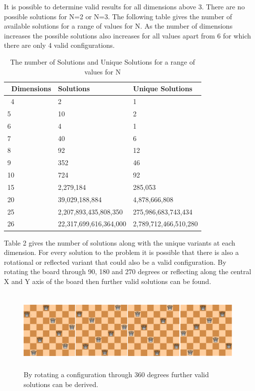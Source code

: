 \documentclass[a4paper,onecolumn,11pt]{article}
\begin{document}
It is possible to determine valid results for all dimensions above 3. There are no possible solutions for N=2 or N=3. The following table gives the number of available solutions for a range of values for N. As the number of dimensions increases the possible solutions also increases for all values apart from 6 for which there are only 4 valid configurations. 

\begin{table}[ht]
\begin{tabular}{|p{2cm}|p{6cm}|p{6cm}|} 
		\hline\
		Dimensions & Solutions & Unique Solutions \\
		\hline\
		4 & 2 & 1 \\ 
		5 & 10 & 2 \\
		6 & 4 & 1 \\
		7 & 40 & 6 \\
		8 & 92 & 12 \\
		9 & 352 & 46 \\
		10 & 724 & 92 \\
		15 & 2,279,184 & 285,053 \\
		20 & 39,029,188,884 & 4,878,666,808 \\
		25 & 2,207,893,435,808,350  & 275,986,683,743,434 \\
		26 & 22,317,699,616,364,000 & 2,789,712,466,510,280 \\
		\hline
	\end{tabular}
	\caption{The number of Solutions and Unique Solutions for a range of values for N}
\end{table}

Table 2 gives the number of solutions along with the unique variants at each dimension. For every solution to the problem it is possible that there is also a rotational or reflected variant that could also be a valid configuration. By rotating the board through 90, 180 and 270 degrees or reflecting along the central X and Y axis of the board then further valid solutions can be found.

\begin{figure}[!htbp]
	\centering	
	\includegraphics[width=16cm, height=4cm]{NQueensRotations}
	\caption{By rotating a configuration through 360 degrees further valid solutions can be derived.}
\end{figure}
\end{document}

